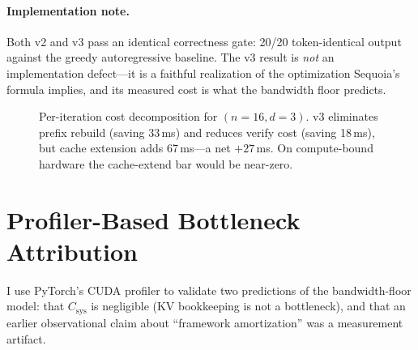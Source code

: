 \documentclass[letterpaper,twocolumn,10pt]{article}
\begin{document}
\paragraph{Implementation note.}
Both v2 and v3 pass an identical correctness gate: 20/20 token-identical output against the greedy autoregressive baseline.
The v3 result is \emph{not} an implementation defect---it is a faithful realization of the optimization Sequoia's formula implies, and its measured cost is what the bandwidth floor predicts.

\begin{figure}[t]
\centering
{}
\caption{Per-iteration cost decomposition for $(n{=}16, d{=}3)$. v3 eliminates prefix rebuild (saving 33\,ms) and reduces verify cost (saving 18\,ms), but cache extension adds 67\,ms---a net $+27\,$ms. On compute-bound hardware the cache-extend bar would be near-zero.}
\label{fig:v2v3}
\end{figure}


\section{Profiler-Based Bottleneck Attribution}
\label{sec:profiler}

I use PyTorch's CUDA profiler to validate two predictions of the bandwidth-floor model: that $C_{\text{sys}}$ is negligible (KV bookkeeping is not a bottleneck), and that an earlier observational claim about ``framework amortization'' was a measurement artifact.
\end{document}
